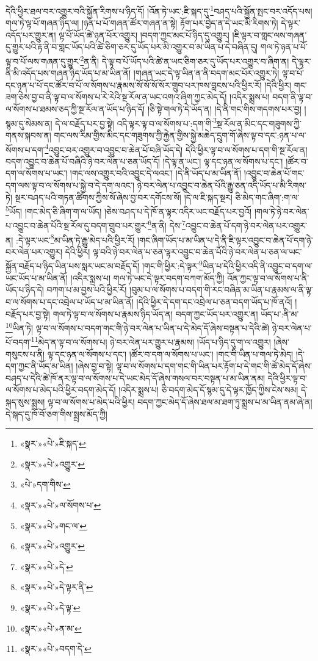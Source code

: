 དེའི་ཕྱིར་ཐལ་བར་འགྱུར་བའི་སྐྱོན་རིགས་པ་ཉིད་དོ། །འོན་ཏེ་ཡང་:ཇི་སྐད་དུ་\footnote{«སྣར་»«པེ་»ཇི་སྐད་}བཤད་པའི་སྐྱོན་སྤང་བར་འདོད་པས། གལ་ཏེ་ལྟ་པོ་གཞན་ཉིད་ལ། །ཉན་པ་པོ་གཞན་ཚོར་གཞན་ན་སྟེ། རྟོག་པར་བྱེད་ན་དེ་ཡང་མི་རིགས་ཏེ། དེ་ལྟར་འདོད་པར་གྱུར་ན། ལྟ་པོ་ཡོད་ཚེ་ཉན་པོར་འགྱུར། །བདག་ཀྱང་མང་པོ་ཉིད་དུ་འགྱུར། །ཇི་ལྟར་བ་གླང་ལས་གཞན་དུ་གྱུར་པའི་རྟ་ནི་བ་གླང་ཡོད་པའི་ཚེ་ཅིག་ཅར་དུ་ཡོད་པར་མི་འགྱུར་བ་མ་ཡིན་པ་དེ་བཞིན་དུ། གལ་ཏེ་ཉན་པ་པོ་ལྟ་བ་པོ་ལས་གཞན་དུ་གྱུར་\footnote{«སྣར་»«པེ་»འགྱུར་}ན་ནི། དེ་ལྟ་བ་པོ་ཡོད་པའི་ཚེ་ན་ཡང་ཅིག་ཅར་དུ་ཡོད་པར་འགྱུར་བ་ཞིག་ན། དེ་ལྟར་ནི་མི་འདོད་པས་གཞན་ཉིད་ཡོད་པ་མ་ཡིན་ནོ། །གཞན་ཡང་དེ་ལྟ་ཡིན་ན་ནི་བདག་མང་པོར་འགྱུར་ཏེ། ལྟ་བ་པོ་དང་ཉན་པ་པོ་དང་ཚོར་བ་པོ་ལ་སོགས་པ་རྣམས་སོ་སོ་སོ་སོར་གྲུབ་པར་ཁས་བླངས་པའི་ཕྱིར་རོ། །དེའི་ཕྱིར། གང་ཟག་ཅེས་བྱ་བ་ནི་ལྟ་བ་ལ་སོགས་པ་རེ་རེའི་སྔ་རོལ་ན་ཡང་འགའ་ཞིག་ཀྱང་མེད་དོ། །འདིར་སྨྲས་པ། བདག་ནི་ལྟ་བ་ལ་སོགས་པ་ཐམས་ཅད་ཀྱི་སྔ་རོལ་ན་ཡོད་པ་ཉིད་དོ། །ཅི་སྟེ་གལ་ཏེ་དེ་ཡོད་ན། །དེ་ནི་གང་གིས་གདགས་པར་བྱ། །སྙམ་དུ་སེམས་ན། དེ་ལ་བརྗོད་པར་བྱ་སྟེ། འདི་ལྟར་ལྟ་བ་ལ་སོགས་པ་:དག་གི་\footnote{«པེ་»དག་གིས་}སྔ་རོལ་ན་མིང་དང་གཟུགས་ཀྱི་གནས་སྐབས་ན། གང་ལས་རིམ་གྱིས་མིང་དང་གཟུགས་ཀྱི་རྐྱེན་གྱིས་སྐྱེ་མཆེད་དྲུག་གོ་ཞེས་ལྟ་བ་དང་:ཉན་པ་ལ་སོགས་པ་དག་\footnote{«སྣར་»«པེ་»ལ་སོགས་པ་}འབྱུང་བར་འགྱུར་བ་འབྱུང་བ་ཆེན་པོ་བཞི་ཡོད་དེ། དེའི་ཕྱིར་ལྟ་བ་ལ་སོགས་པ་དག་གི་སྔ་རོལ་ན། བདག་འབྱུང་བ་ཆེན་པོ་བཞིའི་ཉེ་བར་ལེན་པ་ཅན་ཡོད་དོ། །དེ་ལྟ་ན་ཡང་། ལྟ་དང་ཉན་ལ་སོགས་པ་དང་། །ཚོར་བ་དག་ལ་སོགས་པ་ཡང་། །གང་ལས་འགྱུར་བའི་འབྱུང་དེ་ལའང་། །དེ་ནི་ཡོད་པ་མ་ཡིན་ནོ། །འབྱུང་བ་ཆེན་པོ་གང་དག་ལས་ལྟ་བ་ལ་སོགས་པ་སྐྱེ་བ་དེ་དག་ལའང་། ཉེ་བར་ལེན་པ་འབྱུང་བ་ཆེན་པོའི་རྒྱུ་ཅན་འདི་ཡོད་པ་མི་རིགས་ཏེ། སྔར་བཤད་པའི་གཏན་ཚིགས་ཀྱིས་སོ་ཞེས་བྱ་བར་དགོངས་སོ། །དེ་ལ་ཇི་སྐད་སྔར། ཅི་མེད་གང་ཞིག་:ག་ལ་\footnote{«སྣར་»«པེ་»གང་ལ་}ཡོད། །གང་མེད་ཅི་ཞིག་ག་ལ་ཡོད། །ཅེས་བཤད་པ་དེ་ཁོ་ན་ལྟར་འདིར་ཡང་བརྗོད་པར་བྱའོ། །གལ་ཏེ་ཉེ་བར་ལེན་པ་འབྱུང་བ་ཆེན་པོའི་སྔ་རོལ་དུ་བདག་གྲུབ་པར་གྱུར་\footnote{«སྣར་»«པེ་»འགྱུར་}ན་ནི། དེས་\footnote{«སྣར་»«པེ་»དེ་}འབྱུང་བ་ཆེན་པོ་དག་ཉེ་བར་ལེན་པར་འགྱུར་ན། :དེ་ལྟར་ཡང་\footnote{«སྣར་»«པེ་»དེ་ལྟར་ནི་}མ་ཡིན་ཏེ་རྒྱུ་མེད་པའི་ཕྱིར་རོ། །གང་ཞིག་ཡོད་པ་མ་ཡིན་པ་དེ་ནི་ཇི་ལྟར་འབྱུང་བ་ཆེན་པོ་དག་ཉེ་བར་ལེན་པར་འགྱུར། དེའི་ཕྱིར། ལྟ་བའི་ཉེ་བར་ལེན་པ་ཅན་ལྟར་འབྱུང་བ་ཆེན་པོའི་ཉེ་བར་ལེན་པ་ཅན་ལ་ཡང་སྐྱོན་བརྗོད་པ་ཉིད་ཡིན་པས་སླར་ཡང་མ་བརྗོད་དོ། །གང་གི་ཕྱིར་:དེ་ལྟར་\footnote{«སྣར་»«པེ་»དེ་ལྟ་}ཡིན་པ་དེའི་ཕྱིར་འདི་ནི་འབྱུང་བ་དག་ལ་ཡང་ཡོད་པ་མ་ཡིན་ནོ། །འདིར་སྨྲས་པ། གལ་ཏེ་ཡང་དེ་ལྟར་བདག་བཀག་མོད་ཀྱི། འོན་ཀྱང་ལྟ་བ་ལ་སོགས་པ་ནི་ཡོད་པ་ཉིད་དེ། བཀག་པ་མ་བྱས་པའི་ཕྱིར་རོ། །བུམ་པ་ལ་སོགས་པ་བདག་གི་རང་བཞིན་མ་ཡིན་པ་རྣམས་ལ་ནི་ལྟ་བ་ལ་སོགས་པ་དང་འབྲེལ་པ་ཡོད་པ་མ་ཡིན་ནོ། །དེའི་ཕྱིར་དེ་དག་དང་འབྲེལ་པ་ཅན་བདག་ཡོད་པ་ཁོ་ནའོ། །བརྗོད་པར་བྱ་སྟེ། གལ་ཏེ་ལྟ་བ་ལ་སོགས་པ་རྣམས་ཉིད་ཡོད་ན། བདག་ཀྱང་ཡོད་པར་འགྱུར་ན། ཡོད་པ་:ནི་མ་\footnote{«སྣར་»«པེ་»ན་མ་}ཡིན་ཏེ། ལྟ་བ་ལ་སོགས་པ་བདག་གང་གི་ཉེ་བར་ལེན་པ་ཡིན་པ་དེ་མེད་དོ་ཞེས་བསྟན་པ་དེའི་ཚེ། ཉེ་བར་ལེན་པ་པོ་བདག་\footnote{«སྣར་»«པེ་»བདག་དེ་}མེད་ན་ལྟ་བ་ལ་སོགས་པ། ཉེ་བར་ལེན་པར་གྱུར་པ་རྣམས། །ཡོད་པ་ཉིད་དུ་ག་ལ་འགྱུར། །ཞེས་གསུངས་པ་ནི། ལྟ་དང་ཉན་ལ་སོགས་པ་དང་། །ཚོར་བ་དག་ལ་སོགས་པ་ཡང་། །གང་གི་ཡིན་པ་གལ་ཏེ་མེད། །དེ་དག་ཀྱང་ནི་ཡོད་མ་ཡིན། །ཞེས་བྱ་བ་སྟེ། ལྟ་བ་ལ་སོགས་པ་དག་གང་གི་ཡིན་པར་རྟོག་པ་དེ་གང་གི་ཚེ་མེད་དོ་ཞེས་བཤད་པ་དེའི་ཚེ་ཁོ་ནར་ལྟ་བ་ལ་སོགས་པ་དེ་ཡང་མེད་དོ་ཞེས་གསལ་བར་བསྟན་པ་མ་ཡིན་ནམ། དེའི་ཕྱིར་ལྟ་བ་ལ་སོགས་པ་མེད་པའི་ཕྱིར་བདག་མེད་དོ། །འདིར་སྨྲས་པ། ཅི་བདག་མེད་དོ་སྙམ་དུ་དེ་ལྟར་ཁྱོད་ཀྱིས་ངེས་སམ། དེ་སྐད་སུས་སྨྲས། ལྟ་བ་ལ་སོགས་པ་མེད་པའི་ཕྱིར། བདག་ཀྱང་མེད་དོ་ཞེས་ཐལ་མ་ཐག་ཏུ་སྨྲས་པ་མ་ཡིན་ནམ་ཞེ་ན། དེ་སྐད་དུ་ཁོ་བོ་ཅག་གིས་སྨྲས་མོད་ཀྱི། 